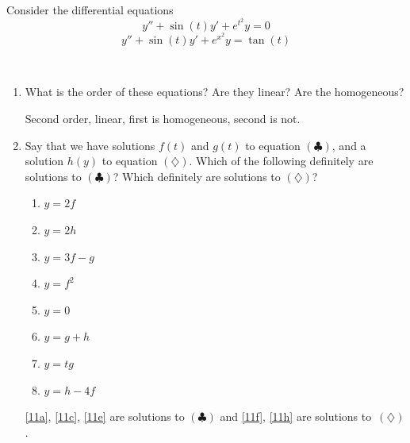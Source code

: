 \documentclass[12pt]{amsart}
\numberwithin{equation}{section}
\theoremstyle{plain} %
\theoremstyle{definition}
\theoremstyle{remark}
\begin{document}
	
	Consider the differential equations
	\begin{equation}\tag{$\clubsuit$} y'' + \sin(t) y' + e^{t^2} y = 0 \end{equation}
		\begin{equation}\tag{$\diamondsuit$} y'' + \sin(t) y' + e^{x^2} y = \tan(t) \end{equation}
	
	\
	
\begin{enumerate}
\item What is the order of these equations? Are they linear? Are the homogeneous?

\begin{framed}
Second order, linear, first is homogeneous, second is not.
\end{framed}

\item Say that we have solutions $f(t)$ and $g(t)$  to equation $(\clubsuit)$, and a solution $h(y)$  to equation $(\diamondsuit)$. 
Which of the following definitely are solutions to $(\clubsuit)$? Which definitely are solutions to $(\diamondsuit)$? 
\begin{multicols}{3}
\begin{enumerate}
\item\label{11a} $y= 2f$
\item\label{11b} $y= 2h$
\item\label{11c} $y=3f-g$
\item\label{11d} $y=f^2$
\item\label{11e} $y=0$
\item\label{11f} $y=g+h$
\item\label{11g} $y=tg$
\item\label{11h} $y=h-4f$
\end{enumerate}
\end{multicols}
\begin{framed}
\noindent \ref{11a}, \ref{11c}, \ref{11e} are solutions to $(\clubsuit)$ and \ref{11f}, \ref{11h} are solutions to~$(\diamondsuit)$.
\end{framed}



\end{enumerate}
\end{document}
